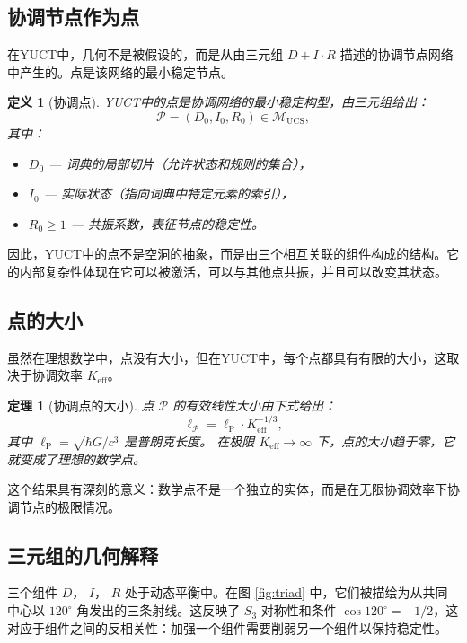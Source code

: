 \documentclass[12pt,a4paper]{article}
\newtheorem{theorem}{定理}
\newtheorem{definition}{定义}
\newcommand{\Keff}{K_{\mathrm{eff}}}
\newcommand{\calP}{\mathcal{P}}
\newcommand{\ellP}{\ell_{\mathrm{P}}}
\begin{document}
	\subsection{协调节点作为点}
	
	在YUCT中，几何不是被假设的，而是从由三元组 \(D+I\cdot R\) 描述的协调节点网络中产生的。点是该网络的最小稳定节点。
	
	\begin{definition}[协调点]
		YUCT中的点是协调网络的最小稳定构型，由三元组给出：
		\[
		\calP = (D_0, I_0, R_0) \in \mathcal{M}_{\mathrm{UCS}},
		\]
		其中：
		\begin{itemize}
			\item \(D_0\) — 词典的局部切片（允许状态和规则的集合），
			\item \(I_0\) — 实际状态（指向词典中特定元素的索引），
			\item \(R_0 \ge 1\) — 共振系数，表征节点的稳定性。
		\end{itemize}
	\end{definition}
	
	因此，YUCT中的点不是空洞的抽象，而是由三个相互关联的组件构成的结构。它的内部复杂性体现在它可以被激活，可以与其他点共振，并且可以改变其状态。
	
	\subsection{点的大小}
	
	虽然在理想数学中，点没有大小，但在YUCT中，每个点都具有有限的大小，这取决于协调效率 \(\Keff\)。
	
	\begin{theorem}[协调点的大小]
		点 \(\calP\) 的有效线性大小由下式给出：
		\[
		\ell_{\calP} = \ellP \cdot \Keff^{-1/3},
		\]
		其中 \(\ellP = \sqrt{\hbar G / c^3}\) 是普朗克长度。
		在极限 \(\Keff \to \infty\) 下，点的大小趋于零，它就变成了理想的数学点。
	\end{theorem}
	
	这个结果具有深刻的意义：数学点不是一个独立的实体，而是在无限协调效率下协调节点的极限情况。
	
	\subsection{三元组的几何解释}
	
	三个组件 \(D\)， \(I\)， \(R\) 处于动态平衡中。在图 \ref{fig:triad} 中，它们被描绘为从共同中心以 \(120^\circ\) 角发出的三条射线。这反映了 \(S_3\) 对称性和条件 \(\cos 120^\circ = -1/2\)，这对应于组件之间的反相关性：加强一个组件需要削弱另一个组件以保持稳定性。
	
\end{document}
